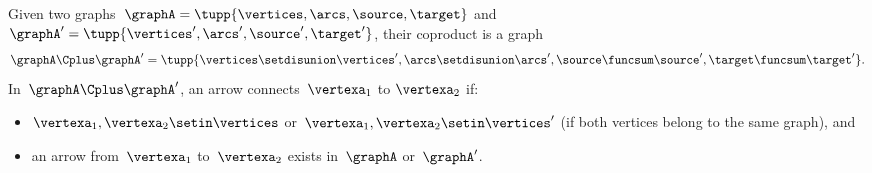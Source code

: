 \begin{example}
    \label{def:ex_graph}
    Given two graphs~$\graphA=\tupp{\vertices,\arcs,\source,\target}$ and~$\graphA'=\tupp{\vertices',\arcs',\source',\target'}$, their coproduct is a graph
    \begin{equation}
        \graphA\Cplus\graphA'=\tupp{\vertices \setdisunion\vertices',\arcs \setdisunion\arcs',\source\funcsum\source',\target\funcsum\target'}.
    \end{equation}
    In~$\graphA\Cplus\graphA'$, an arrow connects~$\vertexa_1$ to $\vertexa_2$ if:
    \begin{itemize}
        \item $\vertexa_1,\vertexa_2\setin \vertices$ or~$\vertexa_1,\vertexa_2\setin \vertices'$ (if both vertices belong to the same graph), and
        \item an arrow from~$\vertexa_1$ to~$\vertexa_2$ exists in~$\graphA$ or~$\graphA'$.
    \end{itemize}


\end{example}
